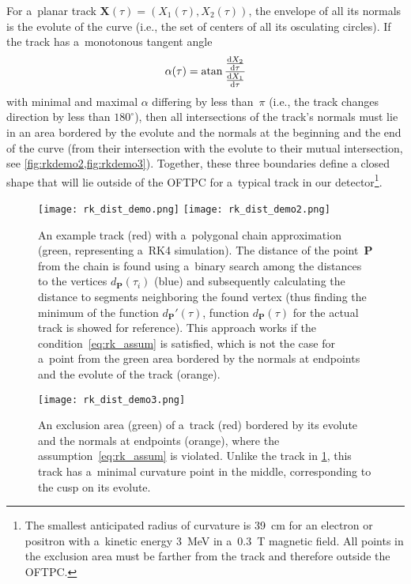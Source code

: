 		For a~planar track $\mathbf{X}(\tau) = \left(X_1(\tau),X_2(\tau)\right)$, the envelope of all its normals is the evolute of the curve (i.e., the set of centers of all its osculating circles). If the track has a~monotonous tangent angle
			\begin{equation}
				\alpha(\tau) = \atan{\frac{\dv{X_2}{\tau}}{\dv{X_1}{\tau}}}
			\end{equation}
		with minimal and maximal $\alpha$ differing by less than~$\pi$ (i.e., the track changes direction by less than $180^\circ$), then all intersections of the track's normals must lie in an area bordered by the evolute and the normals at the beginning and the end of the curve (from their intersection with the evolute to their mutual intersection, see \cref{fig:rkdemo2,fig:rkdemo3}). Together, these three boundaries define a closed shape that will lie outside of the \ac{OFTPC} for a~typical track in our detector\footnote{The smallest anticipated radius of curvature is \qty{39}{\cm} for an electron or positron with a~kinetic energy \qty{3}{\MeV} in a~\qty{0.3}{\tesla} magnetic field. All points in the exclusion area must be farther from the track and therefore outside the \ac{OFTPC}.}.
			\begin{figure}
				\centering
				\texttt{[image: rk\_dist\_demo.png]}
				\hfill
				\texttt{[image: rk\_dist\_demo2.png]}
				\caption{An example track (red) with a~polygonal chain approximation (green, representing a~\ac{RK4} simulation). The distance of the point~$\mathbf{P}$ from the chain is found using a~binary search among the distances to the vertices $d_\mathbf{P}(\tau_i)$ (blue) and subsequently calculating the distance to segments neighboring the found vertex (thus finding the minimum of the function $d_\mathbf{P}'(\tau)$, function $d_\mathbf{P}(\tau)$ for the actual track is showed for reference). This approach works if the condition~\ref{eq:rk_assum} is satisfied, which is not the case for a~point from the green area bordered by the normals at endpoints and the evolute of the track (orange).}
				\label{fig:rkdemo2}
			\end{figure}
			\begin{figure}
				\centering
				\texttt{[image: rk\_dist\_demo3.png]}
				\caption{An exclusion area (green) of a~track (red) bordered by its evolute and the normals at endpoints (orange), where the assumption~\ref{eq:rk_assum} is violated. Unlike the track in \cref{fig:rkdemo2}, this track has a~minimal curvature point in the middle, corresponding to the cusp on its evolute.}
				\label{fig:rkdemo3}
			\end{figure}
		
